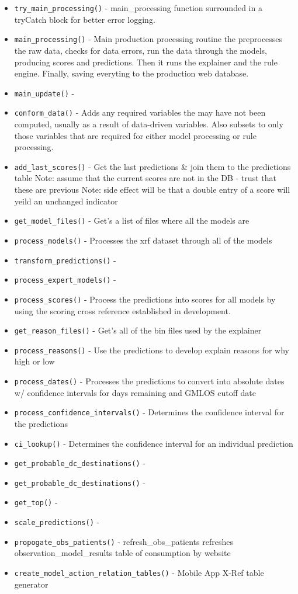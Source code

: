 \documentclass[
]{book}
\providecommand{\tightlist}{%
  \setlength{\itemsep}{0pt}\setlength{\parskip}{0pt}}
\begin{document}
\begin{itemize}
\tightlist
\item
  \texttt{try\_main\_processing()} - main\_processing function surrounded in a tryCatch block for better error logging.
\item
  \texttt{main\_processing()} - Main production processing routine the preprocesses the raw data, checks for data errors, run the data through the models, producing scores and predictions. Then it runs the explainer and the rule engine. Finally, saving everyting to the production web database.
\item
  \texttt{main\_update()} -
\item
  \texttt{conform\_data()} - Adds any required variables the may have not been computed, usually as a result of data-driven variables. Also subsets to only those variables that are required for either model processing or rule processing.
\item
  \texttt{add\_last\_scores()} - Get the last predictions \& join them to the predictions table Note: assume that the current scores are not in the DB - trust that these are previous Note: side effect will be that a double entry of a score will yeild an unchanged indicator
\item
  \texttt{get\_model\_files()} - Get's a list of files where all the models are
\item
  \texttt{process\_models()} - Processes the xrf dataset through all of the models
\item
  \texttt{transform\_predictions()} -
\item
  \texttt{process\_expert\_models()} -
\item
  \texttt{process\_scores()} - Process the predictions into scores for all models by using the scoring cross reference established in development.
\item
  \texttt{get\_reason\_files()} - Get's all of the bin files used by the explainer
\item
  \texttt{process\_reasons()} - Use the predictions to develop explain reasons for why high or low
\item
  \texttt{process\_dates()} - Processes the predictions to convert into absolute dates w/ confidence intervals for days remaining and GMLOS cutoff date
\item
  \texttt{process\_confidence\_intervals()} - Determines the confidence interval for the predictions
\item
  \texttt{ci\_lookup()} - Determines the confidence interval for an individual prediction
\item
  \texttt{get\_probable\_dc\_destinations()} -
\item
  \texttt{get\_probable\_dc\_destinations()} -
\item
  \texttt{get\_top()} -
\item
  \texttt{scale\_predictions()} -
\item
  \texttt{propogate\_obs\_patients()} - refresh\_obs\_patients refreshes observation\_model\_results table of consumption by website
\item
  \texttt{create\_model\_action\_relation\_tables()} - Mobile App X-Ref table generator
\end{itemize}
\end{document}
